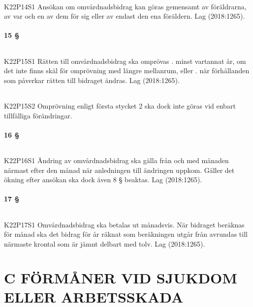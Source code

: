 \documentclass[a4paper,notitlepage,openany,10pt]{book}
\begin{document}
\paragraph*{}
{\tiny K22P14S1}
Ansökan om omvårdnadsbidrag kan göras gemensamt av föräldrarna, av var och en av dem för sig eller av endast den ena föräldern.
Lag (2018:1265).
\subsection*{15 §}
\paragraph*{}
{\tiny K22P15S1}
Rätten till omvårdnadsbidrag ska omprövas
. minst vartannat år, om det inte finns skäl för omprövning med längre mellanrum, eller
. när förhållanden som påverkar rätten till bidraget ändras.
Lag (2018:1265).
\paragraph*{}
{\tiny K22P15S2}
Omprövning enligt första stycket 2 ska dock inte göras vid enbart tillfälliga förändringar.
\subsection*{16 §}
\paragraph*{}
{\tiny K22P16S1}
Ändring av omvårdnadsbidrag ska gälla från och med månaden närmast efter den månad när anledningen till ändringen uppkom. Gäller det ökning efter ansökan ska dock även 8 § beaktas.
Lag (2018:1265).
\subsection*{17 §}
\paragraph*{}
{\tiny K22P17S1}
Omvårdnadsbidrag ska betalas ut månadsvis. När bidraget beräknas för månad ska det bidrag för år räknat som beräkningen utgår från avrundas till närmaste krontal som är jämnt delbart med tolv.
Lag (2018:1265).
\part*{C FÖRMÅNER VID SJUKDOM ELLER ARBETSSKADA}
\end{document}
